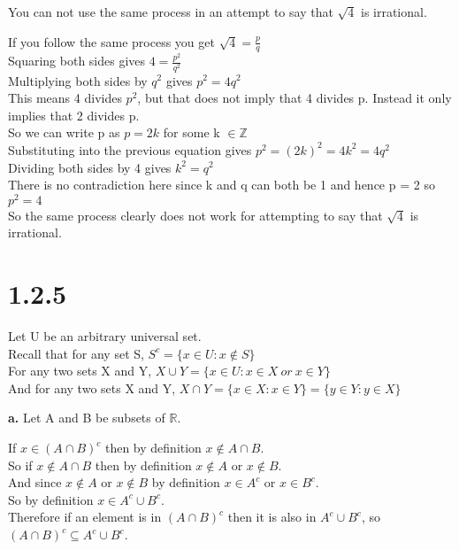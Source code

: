 \documentclass{article}
\begin{document}
 You can not use the same process in an attempt to say that $\sqrt{4}$ is irrational.
\begin{center}
    \doublespacing
    If you follow the same process you get $\sqrt{4} = \frac{p}{q}$
    \\Squaring both sides gives $4 = \frac{p^2}{q^2}$
    \\Multiplying both sides by $q^2$ gives $p^2 = 4q^2$
    \\This means 4 divides $p^2$, but that does not imply that 4 divides p. Instead it only implies that 2 divides p.
    \\So we can write p as $p=2k$ for some k $\in \mathbb{Z}$
    \\Substituting into the previous equation gives $p^2 = (2k)^2 = 4k^2 = 4q^2$
    \\Dividing both sides by 4 gives $k^2 = q^2$
    \\There is no contradiction here since k and q can both be 1 and hence p = 2 so $p^2 = 4$
    \\So the same process clearly does not work for attempting to say that $\sqrt{4}$ is irrational.
\end{center}


\newpage
\section*{1.2.5}
\begin{center}
    Let U be an arbitrary universal set.
    \\Recall that for any set S, $S^c = \{x\in U: x\notin S\}$
    \\For any two sets X and Y, $X\cup Y = \{x\in U: x\in X \:or\: x\in Y\}$
    \\And for any two sets X and Y, $X\cap Y = \{x\in X: x\in Y\} = \{y\in Y: y\in X\}$
\end{center}

{\Large \textbf{a.}} Let A and B be subsets of $\mathbb{R}$.
\begin{center}
    \doublespacing
    If $x\in (A\cap B)^c$ then by definition $x\notin A\cap B$.
    \\So if $x\notin A\cap B$ then by definition $x\notin A$ or $x\notin B$.
    \\And since $x\notin A$ or $x\notin B$ by definition $x\in A^c$ or $x\in B^c$.
    \\So by definition $x\in A^c\cup B^c$.
    \\Therefore if an element is in $(A\cap B)^c$ then it is also in $A^c\cup B^c$, so $(A\cap B)^c\subseteq A^c\cup B^c$.
\end{center}
\end{document}
